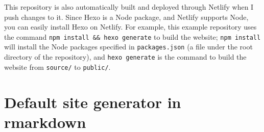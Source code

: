 \documentclass[12pt,]{krantz}
\makeatletter
\newenvironment{Shaded}{\begin{snugshade}}{\end{snugshade}}
\newcommand{\CommentTok}[1]{\textcolor[rgb]{0.56,0.35,0.01}{\textit{#1}}}
\newcommand{\DataTypeTok}[1]{\textcolor[rgb]{0.13,0.29,0.53}{#1}}
\newcommand{\DecValTok}[1]{\textcolor[rgb]{0.00,0.00,0.81}{#1}}
\newcommand{\KeywordTok}[1]{\textcolor[rgb]{0.13,0.29,0.53}{\textbf{#1}}}
\newcommand{\NormalTok}[1]{#1}
\newcommand{\OperatorTok}[1]{\textcolor[rgb]{0.81,0.36,0.00}{\textbf{#1}}}
\newcommand{\OtherTok}[1]{\textcolor[rgb]{0.56,0.35,0.01}{#1}}
\newcommand{\StringTok}[1]{\textcolor[rgb]{0.31,0.60,0.02}{#1}}
\newenvironment{kframe}{%
\medskip{}
\setlength{\fboxsep}{.8em}
 \def\at@end@of@kframe{}%
 \ifinner\ifhmode%
  \def\at@end@of@kframe{\end{minipage}}%
  \begin{minipage}{\columnwidth}%
 \fi\fi%
 \def\FrameCommand##1{\hskip\@totalleftmargin \hskip-\fboxsep
 \colorbox{shadecolor}{##1}\hskip-\fboxsep
     \hskip-\linewidth \hskip-\@totalleftmargin \hskip\columnwidth}%
 \MakeFramed {\advance\hsize-\width
   \@totalleftmargin\z@ \linewidth\hsize
   \@setminipage}}%
 {\par\unskip\endMakeFramed%
 \at@end@of@kframe}
\renewenvironment{Shaded}{\begin{kframe}}{\end{kframe}}
\theoremstyle{definition}
\theoremstyle{definition}
\theoremstyle{definition}
\theoremstyle{remark}
\makeatother
\begin{document}
\begin{Shaded}
\end{Shaded}

This repository is also automatically built and deployed through
Netlify when I push changes to it. Since Hexo is a Node
package, and Netlify supports Node, you can easily install Hexo on
Netlify. For example, this example repository uses the command
\texttt{npm\ install\ \&\&\ hexo\ generate} to build the website;
\texttt{npm\ install} will install the Node packages specified in
\texttt{packages.json} (a file under the root directory of the
repository), and \texttt{hexo\ generate} is the command to build the
website from \texttt{source/} to \texttt{public/}.

\hypertarget{rmd-website}{%
\section{Default site generator in rmarkdown}\label{rmd-website}}
\end{document}
